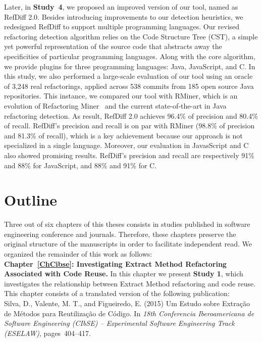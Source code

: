 Later, in \textbf{Study~4}, we proposed an improved version of our tool, named as RefDiff 2.0.
Besides introducing improvements to our detection heuristics, we redesigned RefDiff to support multiple programming languages. Our revised refactoring detection algorithm relies on the Code Structure Tree (CST), a simple yet powerful representation of the source code that abstracts away the specificities of particular programming languages.
Along with the core algorithm, we provide plugins for three programming languages: Java, JavaScript, and C.
In this study, we also performed a large-scale evaluation of our tool using an  oracle of 3,248 real refactorings, applied across 538 commits from 185 open source Java repositories.
This instance, we compared our tool with RMiner, which is an evolution of Refactoring Miner~\citep{tsantalis2018rminer} and the current state-of-the-art in Java refactoring detection.
As result, RefDiff 2.0 achieves 96.4\% of precision and 80.4\% of recall.
RefDiff's precision and recall is on par with RMiner (98.8\% of precision and 81.3\% of recall), which is a key achievement because our approach is not specialized in a single language.
Moreover, our  evaluation  in  JavasScript  and  C  also showed promising results. RefDiff’s precision and recall are respectively 91\% and 88\% for JavaScript, and 88\% and 91\% for C.





\section{Outline}
\label{SecOutline}

Three out of six chapters of this theses consists in studies published in software engineering conference and journals.
Therefore, these chapters preserve the original structure of the manuscripts in order to facilitate independent read.
We organized the remainder of this work as follows:
\\[6pt]

\noindent\textbf{Chapter~\ref{ChCibse}: Investigating Extract Method Refactoring Associated with Code Reuse.} In this chapter we present \textbf{Study 1}, which investigates the relationship between Extract Method refactoring and code reuse. This chapter consists of a translated version of the following publication:
\\[6pt]
\noindent Silva, D., Valente, M. T., and Figueiredo, E. (2015) Um Estudo sobre Extração de Métodos para Reutilização de Código. In \emph{18th Conferencia Iberoamericana de Software Engineering (CIbSE) -- Experimental Software Engineering Track (ESELAW)}, pages~404--417.
\\[6pt]

